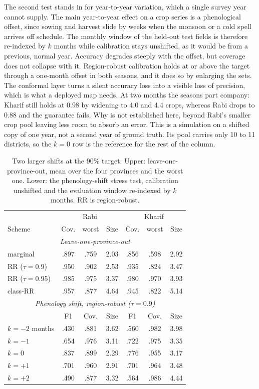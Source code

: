\documentclass[conference]{IEEEtran}
\begin{document}
The second test stands in for year-to-year variation, which a single survey year
cannot supply. The main year-to-year effect on a crop series is a phenological offset,
since sowing and harvest slide by weeks when the monsoon or a cold spell arrives off
schedule. The monthly window of the held-out test fields is therefore re-indexed by
$k$ months while calibration stays unshifted, as it would be from a previous, normal
year. Accuracy degrades steeply with the offset, but coverage does not collapse with
it. Region-robust calibration holds at or above the target through a one-month offset
in both seasons, and it does so by enlarging the sets. The conformal layer turns a
silent accuracy loss into a visible loss of precision, which is what a deployed map
needs. At two months the seasons part company: Kharif still holds at 0.98 by widening
to 4.0 and 4.4 crops, whereas Rabi drops to 0.88 and the guarantee fails. Why is not
established here, beyond Rabi's smaller crop pool leaving less room to absorb an
error. This is a simulation on a shifted copy of one year, not a second year of ground
truth. Its pool carries only 10 to 11 districts, so the $k{=}0$ row is the reference
for the rest of the column.

\begin{table}[t]\centering\caption{Two larger shifts at the 90\% target. Upper:
leave-one-province-out, mean over the four provinces and the worst one. Lower: the
phenology-shift stress test, calibration unshifted and the evaluation window
re-indexed by $k$ months. RR is region-robust.}\label{tab:transfer}
\footnotesize
\setlength{\tabcolsep}{3.5pt}
\begin{tabular}{lcccccc}
\toprule
 & \multicolumn{3}{c}{Rabi} & \multicolumn{3}{c}{Kharif}\\
Scheme & Cov. & worst & Size & Cov. & worst & Size\\
\midrule
\multicolumn{7}{c}{\textit{Leave-one-province-out}}\\
marginal            & .897 & .759 & 2.03 & .856 & .598 & 2.92\\
RR ($\tau{=}0.9$)   & .950 & .902 & 2.53 & .935 & .824 & 3.47\\
RR ($\tau{=}0.95$)  & .985 & .975 & 3.37 & .980 & .970 & 3.93\\
class-RR            & .957 & .877 & 4.64 & .945 & .822 & 5.14\\
\midrule
\multicolumn{7}{c}{\textit{Phenology shift, region-robust ($\tau{=}0.9$)}}\\
 & F1 & Cov. & Size & F1 & Cov. & Size\\
$k{=}{-}2$ months   & .430 & .881 & 3.62 & .560 & .982 & 3.98\\
$k{=}{-}1$          & .654 & .976 & 3.11 & .722 & .975 & 3.35\\
$k{=}0$             & .837 & .899 & 2.29 & .776 & .955 & 3.17\\
$k{=}{+}1$          & .701 & .960 & 2.91 & .701 & .964 & 3.48\\
$k{=}{+}2$          & .490 & .877 & 3.32 & .564 & .986 & 4.44\\
\bottomrule
\end{tabular}\end{table}
\end{document}
